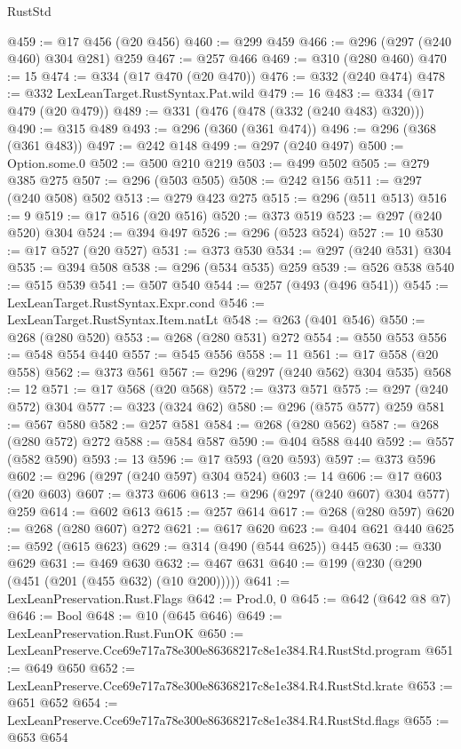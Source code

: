 \begin{lexlean}{RustStd}
\begin{coremodule}
@459 := @17 @456 (@20 @456)
@460 := @299 @459
@466 := @296 (@297 (@240 @460) @304 @281) @259
@467 := @257 @466
@469 := @310 (@280 @460)
@470 := 15
@474 := @334 (@17 @470 (@20 @470))
@476 := @332 (@240 @474)
@478 := @332 LexLeanTarget.RustSyntax.Pat.wild
@479 := 16
@483 := @334 (@17 @479 (@20 @479))
@489 := @331 (@476 (@478 (@332 (@240 @483) @320)))
@490 := @315 @489
@493 := @296 (@360 (@361 @474))
@496 := @296 (@368 (@361 @483))
@497 := @242 @148
@499 := @297 (@240 @497)
@500 := Option.some.{0}
@502 := @500 @210 @219
@503 := @499 @502
@505 := @279 @385 @275
@507 := @296 (@503 @505)
@508 := @242 @156
@511 := @297 (@240 @508) @502
@513 := @279 @423 @275
@515 := @296 (@511 @513)
@516 := 9
@519 := @17 @516 (@20 @516)
@520 := @373 @519
@523 := @297 (@240 @520) @304
@524 := @394 @497
@526 := @296 (@523 @524)
@527 := 10
@530 := @17 @527 (@20 @527)
@531 := @373 @530
@534 := @297 (@240 @531) @304
@535 := @394 @508
@538 := @296 (@534 @535) @259
@539 := @526 @538
@540 := @515 @539
@541 := @507 @540
@544 := @257 (@493 (@496 @541))
@545 := LexLeanTarget.RustSyntax.Expr.cond
@546 := LexLeanTarget.RustSyntax.Item.natLt
@548 := @263 (@401 @546)
@550 := @268 (@280 @520)
@553 := @268 (@280 @531) @272
@554 := @550 @553
@556 := @548 @554 @440
@557 := @545 @556
@558 := 11
@561 := @17 @558 (@20 @558)
@562 := @373 @561
@567 := @296 (@297 (@240 @562) @304 @535)
@568 := 12
@571 := @17 @568 (@20 @568)
@572 := @373 @571
@575 := @297 (@240 @572) @304
@577 := @323 (@324 @62)
@580 := @296 (@575 @577) @259
@581 := @567 @580
@582 := @257 @581
@584 := @268 (@280 @562)
@587 := @268 (@280 @572) @272
@588 := @584 @587
@590 := @404 @588 @440
@592 := @557 (@582 @590)
@593 := 13
@596 := @17 @593 (@20 @593)
@597 := @373 @596
@602 := @296 (@297 (@240 @597) @304 @524)
@603 := 14
@606 := @17 @603 (@20 @603)
@607 := @373 @606
@613 := @296 (@297 (@240 @607) @304 @577) @259
@614 := @602 @613
@615 := @257 @614
@617 := @268 (@280 @597)
@620 := @268 (@280 @607) @272
@621 := @617 @620
@623 := @404 @621 @440
@625 := @592 (@615 @623)
@629 := @314 (@490 (@544 @625)) @445
@630 := @330 @629
@631 := @469 @630
@632 := @467 @631
@640 := @199 (@230 (@290 (@451 (@201 (@455 @632) (@10 @200)))))
@641 := LexLeanPreservation.Rust.Flags
@642 := Prod.{0, 0}
@645 := @642 (@642 @8 @7)
@646 := Bool
@648 := @10 (@645 @646)
@649 := LexLeanPreservation.Rust.FunOK
@650 := LexLeanPreserve.Cce69e717a78e300e86368217c8e1e384.R4.RustStd.program
@651 := @649 @650
@652 := LexLeanPreserve.Cce69e717a78e300e86368217c8e1e384.R4.RustStd.krate
@653 := @651 @652
@654 := LexLeanPreserve.Cce69e717a78e300e86368217c8e1e384.R4.RustStd.flags
@655 := @653 @654

\end{coremodule}
\end{lexlean}
